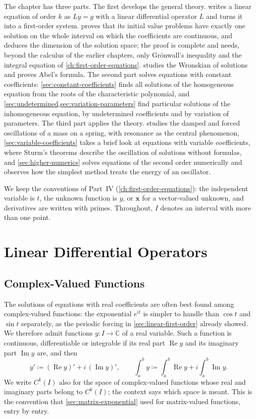 The chapter has three parts. The first develops the general theory.  writes a linear equation of order $k$ as $Ly=g$ with a linear differential operator $L$ and turns it into a first-order system.  proves that its initial value problems have exactly one solution on the whole interval on which the coefficients are continuous, and deduces the dimension of the solution space; the proof is complete and needs, beyond the calculus of the earlier chapters, only Gr\"onwall's inequality and the integral equation of \cref{ch:first-order-equations}.  studies the Wronskian of solutions and proves Abel's formula. The second part solves equations with constant coefficients: \cref{sec:constant-coefficients} finds all solutions of the homogeneous equation from the roots of the characteristic polynomial, and \cref{sec:undetermined,sec:variation-parameters} find particular solutions of the inhomogeneous equation, by undetermined coefficients and by variation of parameters. The third part applies the theory.  studies the damped and forced oscillations of a mass on a spring, with resonance as the central phenomenon, \cref{sec:variable-coefficients} takes a brief look at equations with variable coefficients, where Sturm's theorems describe the oscillation of solutions without formulas, and \cref{sec:higher-numerics} solves equations of the second order numerically and observes how the simplest method treats the energy of an oscillator.

We keep the conventions of Part~IV (\cref{ch:first-order-equations}): the independent variable is $t$, the unknown function is $y$, or $\mathbf x$ for a vector-valued unknown, and derivatives are written with primes. Throughout, $I$ denotes an interval with more than one point.

\section{Linear Differential Operators}
\label{sec:linear-operators}

\subsection{Complex-Valued Functions}

The solutions of equations with real coefficients are often best found among complex-valued functions: the exponential $e^{it}$ is simpler to handle than $\cos t$ and $\sin t$ separately, as the periodic forcing in \cref{sec:linear-first-order} already showed. We therefore admit functions $y\colon I\to\mathbb C$ of a real variable. Such a function is continuous, differentiable or integrable if its real part $\operatorname{Re}y$ and its imaginary part $\operatorname{Im}y$ are, and then
\[
y'\coloneqq(\operatorname{Re}y)'+i\,(\operatorname{Im}y)',\qquad\int_a^by\coloneqq\int_a^b\operatorname{Re}y+i\int_a^b\operatorname{Im}y .
\]
We write $C^k(I)$ also for the space of complex-valued functions whose real and imaginary parts belong to $C^k(I)$; the context says which space is meant. This is the convention that \cref{sec:matrix-exponential} used for matrix-valued functions, entry by entry.

